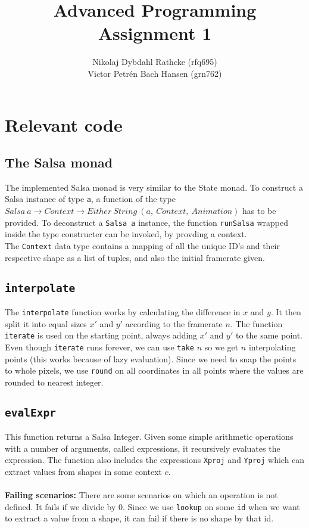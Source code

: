 \documentclass[a4paper]{article}
\author{Nikolaj Dybdahl Rathcke (rfq695) \\ Victor Petrén Bach Hansen (grn762)}
\title{Advanced Programming \\ Assignment 1}
\begin{document}
\maketitle
\section*{Relevant code}
\subsection*{The Salsa monad}
The implemented Salsa monad is very similar to the State monad. To construct a Salsa instance of type \texttt{a}, a function of the type $Salsa\:a \rightarrow Context\rightarrow Either\:String\: (a,\: Context,\: Animation)$ has to be provided. To deconstruct a \texttt{Salsa a} instance, the function \texttt{runSalsa} wrapped inside the type constructer can be invoked, by provding a context.\\
The \texttt{Context} data type contains a mapping of all the unique ID's and their respective shape as a list of tuples, and also the initial framerate given.
\subsection*{\texttt{interpolate}}
The \texttt{interpolate} function works by calculating the difference in $x$ and $y$. It then split it into equal sizes $x'$ and $y'$ according to the framerate $n$. The function \texttt{iterate} is used on the starting point, always adding $x'$ and $y'$ to the same point. Even though \texttt{iterate} runs forever, we can use \texttt{take} $n$ so we get $n$ interpolating points (this works because of lazy evaluation). Since we need to snap the points to whole pixels, we use \texttt{round} on all coordinates in all points where the values are rounded to nearest integer.

\subsection*{\texttt{evalExpr}}
This function returns a Salsa Integer. Given some simple arithmetic operations with a number of arguments, called expressions, it recursively evaluates the expression. The function also includes the expressions \texttt{Xproj} and \texttt{Yproj} which can extract values from shapes in some context $c$. \\
\\
\textbf{Failing scenarios:}
There are some scenarios on which an operation is not defined. It fails if we divide by $0$. Since we use \texttt{lookup} on some \texttt{id} when we want to extract a value from a shape, it can fail if there is no shape by that id.
\end{document}
